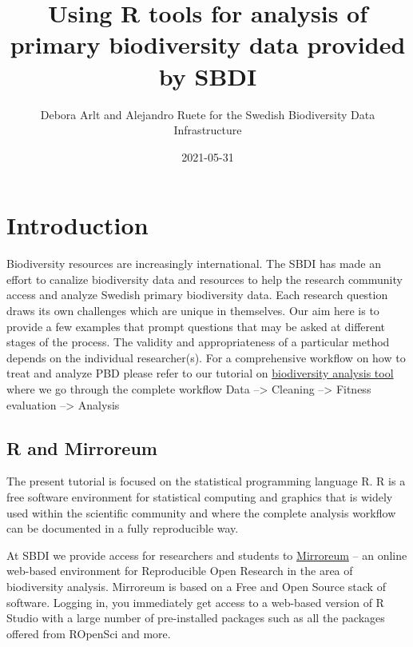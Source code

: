 \documentclass[
  10pt,
]{article}
\title{Using R tools for analysis of primary biodiversity data provided by SBDI}
\author{Debora Arlt and Alejandro Ruete for the Swedish Biodiversity Data Infrastructure}
\date{2021-05-31}
\begin{document}
\maketitle

{
\hypersetup{linkcolor=}
\setcounter{tocdepth}{2}
\tableofcontents
}
\hypertarget{introduction}{%
\section*{Introduction}\label{introduction}}

Biodiversity resources are increasingly international. The SBDI has made an effort to canalize biodiversity data and resources to help the research community access and analyze Swedish primary biodiversity data. Each research question draws its own challenges which are unique in themselves. Our aim here is to provide a few examples that prompt questions that may be asked at different stages of the process. The validity and appropriateness of a particular method depends on the individual researcher(s). For a comprehensive workflow on how to treat and analyze PBD please refer to our tutorial on \href{https://github.com/biodiversitydata-se/biodiversity-analysis-tools}{biodiversity analysis tool} where we go through the complete workflow Data --\textgreater{} Cleaning --\textgreater{} Fitness evaluation --\textgreater{} Analysis

\hypertarget{r-and-mirroreum}{%
\subsection*{R and Mirroreum}\label{r-and-mirroreum}}

The present tutorial is focused on the statistical programming language R. R is a free software environment for statistical computing and graphics that is widely used within the scientific community and where the complete analysis workflow can be documented in a fully reproducible way.

At SBDI we provide access for researchers and students to \href{https://mirroreum.biodiversitydata.se/}{Mirroreum} -- an online web-based environment for Reproducible Open Research in the area of biodiversity analysis. Mirroreum is based on a Free and Open Source stack of software. Logging in, you immediately get access to a web-based version of R Studio with a large number of pre-installed packages such as all the packages offered from ROpenSci and more.
\end{document}
